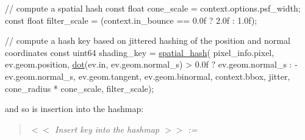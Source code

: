 \begin{DoxyCodeInclude}
            \textcolor{comment}{// compute a spatial hash}
            \textcolor{keyword}{const} \textcolor{keywordtype}{float} cone\_scale   = context.options.psf\_width;
            \textcolor{keyword}{const} \textcolor{keywordtype}{float} filter\_scale = (context.in\_bounce == 0.0f ? 2.0f : 1.0f);

            \textcolor{comment}{// compute a hash key based on jittered hashing of the position and normal coordinates}
            \textcolor{keyword}{const} uint64 shading\_key = \hyperlink{group___spatial_hash_module_ga04c40211588f9601e16bc99d3bef70ed}{spatial\_hash}(
                pixel\_info.pixel,
                ev.geom.position,
                \hyperlink{group___vectors_module_gab7854923b97b44405c7335f0df540fd3}{dot}(ev.in, ev.geom.normal\_s) > 0.0f ? ev.geom.normal\_s : -ev.geom.normal\_s,
                ev.geom.tangent,
                ev.geom.binormal,
                context.bbox,
                jitter,
                cone\_radius * cone\_scale,
                filter\_scale);
\end{DoxyCodeInclude}
 \begin{DoxyParagraph}{}
and so is insertion into the hashmap\+:
\end{DoxyParagraph}
\label{_p_s_f_p_t_page_Insert_key_into_the_hashmap_anchor}%
%
\begin{quote}
{\itshape  $<$$<$ Insert key into the hashmap $>$$>$ \+:= }

\end{quote}

